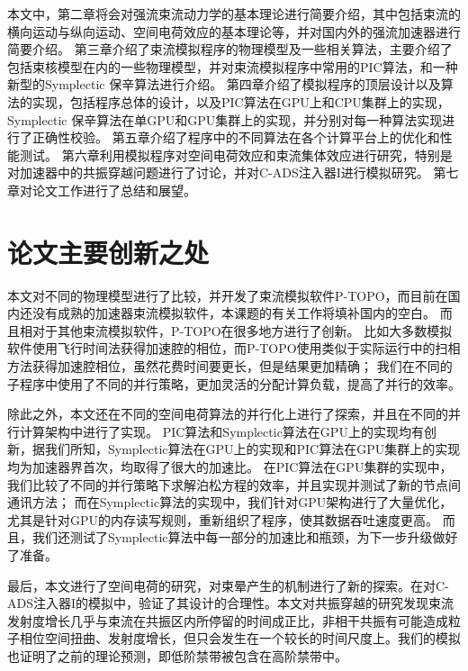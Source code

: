 本文中，第二章将会对强流束流动力学的基本理论进行简要介绍，其中包括束流的横向运动与纵向运动、空间电荷效应的基本理论等，并对国内外的强流加速器进行简要介绍。
第三章介绍了束流模拟程序的物理模型及一些相关算法，主要介绍了包括束核模型在内的一些物理模型，并对束流模拟程序中常用的PIC算法，和一种新型的Symplectic 保辛算法进行介绍。
第四章介绍了模拟程序的顶层设计以及算法的实现，包括程序总体的设计，以及PIC算法在GPU上和CPU集群上的实现，Symplectic 保辛算法在单GPU和GPU集群上的实现，并分别对每一种算法实现进行了正确性校验。
第五章介绍了程序中的不同算法在各个计算平台上的优化和性能测试。
第六章利用模拟程序对空间电荷效应和束流集体效应进行研究，特别是对加速器中的共振穿越问题进行了讨论，并对C-ADS注入器I进行模拟研究。
第七章对论文工作进行了总结和展望。

\section{论文主要创新之处}
本文对不同的物理模型进行了比较，并开发了束流模拟软件P-TOPO，而目前在国内还没有成熟的加速器束流模拟软件，本课题的有关工作将填补国内的空白。
而且相对于其他束流模拟软件，P-TOPO在很多地方进行了创新。
比如大多数模拟软件使用飞行时间法获得加速腔的相位，而P-TOPO使用类似于实际运行中的扫相方法获得加速腔相位，虽然花费时间要更长，但是结果更加精确；
我们在不同的子程序中使用了不同的并行策略，更加灵活的分配计算负载，提高了并行的效率。

除此之外，本文还在不同的空间电荷算法的并行化上进行了探索，并且在不同的并行计算架构中进行了实现。
PIC算法和Symplectic算法在GPU上的实现均有创新，据我们所知，Symplectic算法在GPU上的实现和PIC算法在GPU集群上的实现均为加速器界首次，均取得了很大的加速比。
在PIC算法在GPU集群的实现中，我们比较了不同的并行策略下求解泊松方程的效率，并且实现并测试了新的节点间通讯方法；
而在Symplectic算法的实现中，我们针对GPU架构进行了大量优化，尤其是针对GPU的内存读写规则，重新组织了程序，使其数据吞吐速度更高。
而且，我们还测试了Symplectic算法中每一部分的加速比和瓶颈，为下一步升级做好了准备。

最后，本文进行了空间电荷的研究，对束晕产生的机制进行了新的探索。在对C-ADS注入器I的模拟中，验证了其设计的合理性。本文对共振穿越的研究发现束流发射度增长几乎与束流在共振区内所停留的时间成正比，非相干共振有可能造成粒子相位空间扭曲、发射度增长，但只会发生在一个较长的时间尺度上。我们的模拟也证明了之前的理论预测，即低阶禁带被包含在高阶禁带中。
